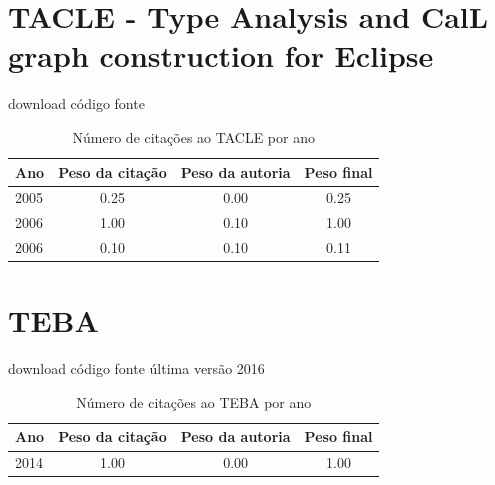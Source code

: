 \section{TACLE - Type Analysis and CalL graph construction for Eclipse}
\checkmark download
\checkmark código fonte
\begin{table}[H]
\caption{Número de citações ao TACLE  por ano}
\centering
\begin{tabular}{| l | c | c | c |}
  \hline
  Ano & Peso da citação & Peso da autoria & Peso final \\
  \hline
  2005
    & 0.25
    & 0.00
    & {\color{red} 0.25} \\
\hline
  2006
    & 1.00
    & 0.10
    & {\color{blue} 1.00} \\
  2006
    & 0.10
    & 0.10
    & {\color{red} 0.11} \\
\hline
\end{tabular}
\end{table}
\section{TEBA}
\checkmark download
\checkmark código fonte
\checkmark última versão 2016
\begin{table}[H]
\caption{Número de citações ao TEBA por ano}
\centering
\begin{tabular}{| l | c | c | c |}
  \hline
  Ano & Peso da citação & Peso da autoria & Peso final \\
  \hline
  2014
    & 1.00
    & 0.00
    & {\color{blue} 1.00} \\
\hline
\end{tabular}
\end{table}
